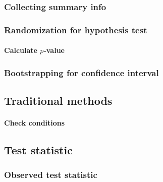 \documentclass[
  12pt, krantz2,
]{krantz}
\begin{document}
\hypertarget{collecting-summary-info-1}{%
\subsubsection*{Collecting summary info}\label{collecting-summary-info-1}}


\hypertarget{randomization-for-hypothesis-test-1}{%
\subsubsection*{Randomization for hypothesis test}\label{randomization-for-hypothesis-test-1}}


\hypertarget{calculate-p-value-3}{%
\paragraph{\texorpdfstring{Calculate \(p\)-value}{Calculate p-value}}\label{calculate-p-value-3}}

\hypertarget{bootstrapping-for-confidence-interval-3}{%
\subsubsection*{Bootstrapping for confidence interval}\label{bootstrapping-for-confidence-interval-3}}


\hypertarget{traditional-methods-3}{%
\subsection{Traditional methods}\label{traditional-methods-3}}

\hypertarget{check-conditions-3}{%
\paragraph{Check conditions}\label{check-conditions-3}}

\hypertarget{test-statistic-3}{%
\subsection{Test statistic}\label{test-statistic-3}}

\hypertarget{observed-test-statistic-3}{%
\subsubsection*{Observed test statistic}\label{observed-test-statistic-3}}
\end{document}

